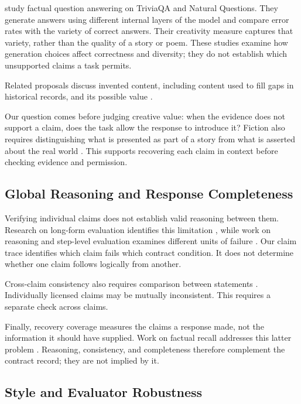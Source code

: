\documentclass{clv2025}
\begin{document}
\citet{he_shakespearean_2025} study factual question answering on TriviaQA
and Natural Questions. They generate answers using different internal
layers of the model and compare error rates with the variety of correct
answers. Their creativity measure captures that variety, rather than the
quality of a story or poem. These studies examine how generation choices
affect correctness and diversity; they do not establish which unsupported
claims a task permits.

Related proposals discuss invented content, including content used to fill
gaps in historical records, and its possible value
\citep{sui_confabulation_2024,sui_critical_2025,yang_hicbench_2025}.

Our question comes before judging creative value: when the evidence does not
support a claim, does the task allow the response to introduce it? Fiction
also requires distinguishing what is presented as part of a story from what
is asserted about the real world \citep{searle_logical_1975}. This supports
recovering each claim in context before checking evidence and permission.

\subsection{Global Reasoning and Response Completeness}\label{subsec:global}

Verifying individual claims does not establish valid reasoning between them.
Research on long-form evaluation identifies this limitation
\citep{yan_logicscore_2026}, while work on reasoning and step-level evaluation
examines different units of failure
\citep{arcuschin_cot_2025,pham_grace_2026}.
Our claim trace identifies which claim fails which contract condition. It
does not determine whether one claim follows logically from another.

Cross-claim consistency also requires comparison between statements
\citep{mundler_selfcontradictory_2024}. Individually licensed claims may be
mutually inconsistent. This requires a separate check across claims.

Finally, recovery coverage measures the claims a response made, not the
information it should have supplied. Work on factual recall addresses this
latter problem \citep{liu_verifact_2025,jafari_recall_2026}.
Reasoning, consistency, and completeness therefore complement the contract
record; they are not implied by it.

\subsection{Style and Evaluator Robustness}
\end{document}
